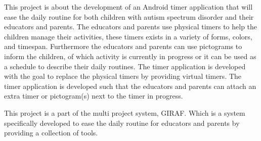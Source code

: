 This project is about the development of an Android timer application that will ease the daily routine for both children with autism spectrum disorder and their educators and parents. The educators and parents use physical timers to help the children manage their activities, these timers exists in a variety of forms, colors, and timespan. Furthermore the educators and parents can use pictograms to inform the children, of which activity is currently in progress or it can be used as a schedule to describe their daily routines. The timer application is developed with the goal to replace the physical timers by providing virtual timers. The timer application is developed such that the educators and parents can attach an extra timer or pictogram(s) next to the timer in progress.

This project is a part of the multi project system, GIRAF. Which is a system specifically developed to ease the daily routine for educators and parents by providing a collection of tools.